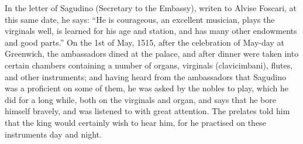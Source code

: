 In the letter of Sagudino (Secretary to the Embassy), writen to Alvise Foscari,
at this same date, he says: “He is courageous, an excellent musician, plays the
virginals well, is learned for his age and station, and has many other endowments
and good parts.” On the 1st of May, 1515, after the celebration of May-day at
Greenwich, the ambassadors dined at the palace, and after dinner were taken into
certain chambers containing a number of organs, virginals (clavicimbani), flutes,
and other instruments; and having heard from the ambassadors that Sagudino 
was a proficient on some of them, he \pagebreak 
was asked by the nobles to play, which
he did for a long while, both on the virginals and organ, and says that he bore
himself bravely, and was listened to with great attention. The prelates told him
that the king would certainly wish to hear him, for he practised on these instruments
day and night.

